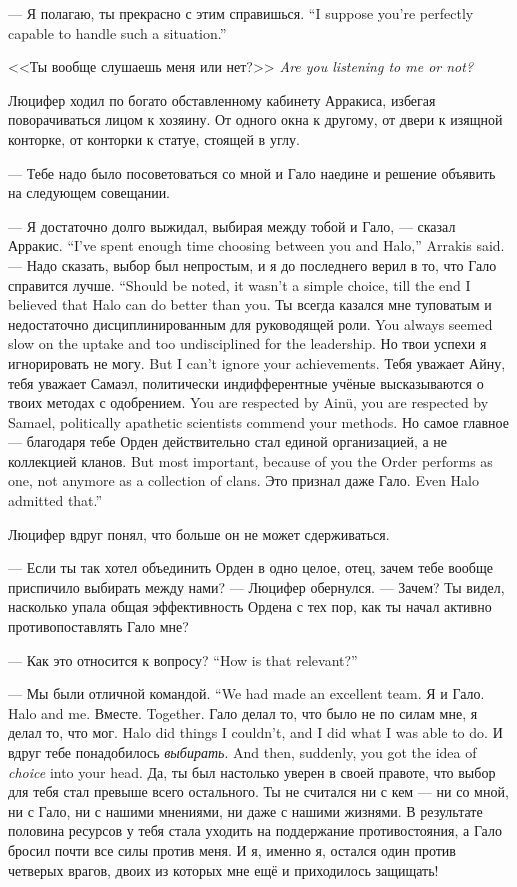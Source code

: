 {--- Я полагаю, ты прекрасно с этим справишься.}
{``I suppose you're perfectly capable to handle such a situation.''}

{<<Ты вообще слушаешь меня или нет?>>}
{\textit{Are you listening to me or not?}}

Люцифер ходил по богато обставленному кабинету Арракиса, избегая поворачиваться лицом к хозяину.
От одного окна к другому, от двери к изящной конторке, от конторки к статуе, стоящей в углу.

--- Тебе надо было посоветоваться со мной и Гало наедине и решение объявить на следующем совещании.

{--- Я достаточно долго выжидал, выбирая между тобой и Гало, --- сказал Арракис.}
{``I've spent enough time choosing between you and Halo,'' Arrakis said.}
{--- Надо сказать, выбор был непростым, и я до последнего верил в то, что Гало справится лучше.}
{``Should be noted, it wasn't a simple choice, till the end I believed that Halo can do better than you.}
{Ты всегда казался мне туповатым и недостаточно дисциплинированным для руководящей роли.}
{You always seemed slow on the uptake and too undisciplined for the leadership.}
{Но твои успехи я игнорировать не могу.}
{But I can't ignore your achievements.}
{Тебя уважает Айну, тебя уважает Самаэл, политически индифферентные учёные высказываются о твоих методах с одобрением.}
{You are respected by Ain\"{u}, you are respected by Samael, politically apathetic scientists commend your methods.}
{Но самое главное --- благодаря тебе Орден действительно стал единой организацией, а не коллекцией кланов.}
{But most important, because of you the Order performs as one, not anymore as a collection of clans.}
{Это признал даже Гало.}
{Even Halo admitted that.''}

Люцифер вдруг понял, что больше он не может сдерживаться.

--- Если ты так хотел объединить Орден в одно целое, отец, зачем тебе вообще приспичило выбирать между нами? --- Люцифер обернулся.
--- Зачем?
Ты видел, насколько упала общая эффективность Ордена с тех пор, как ты начал активно противопоставлять Гало мне?

{--- Как это относится к вопросу?}
{``How is that relevant?''}

{--- Мы были отличной командой.}
{``We had made an excellent team.}
{Я и Гало.}
{Halo and me.}
{Вместе.}
{Together.}
{Гало делал то, что было не по силам мне, я делал то, что мог.}
{Halo did things I couldn't, and I did what I was able to do.}
{И вдруг тебе понадобилось \emph{выбирать}.}
{And then, suddenly, you got the idea of \emph{choice} into your head.}
Да, ты был настолько уверен в своей правоте, что выбор для тебя стал превыше всего остального.
Ты не считался ни с кем --- ни со мной, ни с Гало, ни с нашими мнениями, ни даже с нашими жизнями.
В результате половина ресурсов у тебя стала уходить на поддержание противостояния, а Гало бросил почти все силы против меня.
И я, именно я, остался один против четверых врагов, двоих из которых мне ещё и приходилось защищать!

